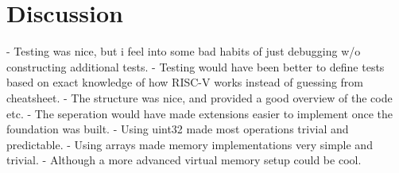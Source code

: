 \section*{Discussion}

- Testing was nice, but i feel into some bad habits of just debugging w/o constructing additional tests.
- Testing would have been better to define tests based on exact knowledge of how RISC-V works instead of guessing from cheatsheet.
- The structure was nice, and provided a good overview of the code etc.
- The seperation would have made extensions easier to implement once the foundation was built.
- Using uint32 made most operations trivial and predictable.
- Using arrays made memory implementations very simple and trivial.
- Although a more advanced virtual memory setup could be cool.
